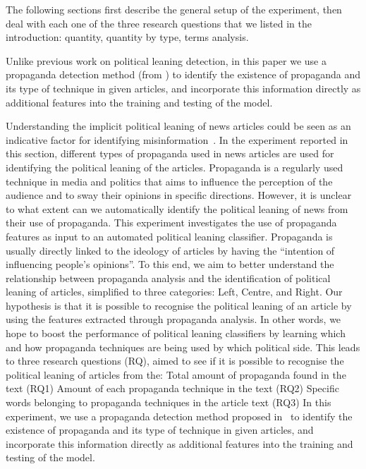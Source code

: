 The following sections first describe the general setup of the experiment, then deal with each one of the three research questions that we listed in the introduction: quantity, quantity by type, terms analysis.%


Unlike previous work on political leaning detection, in this paper we use a propaganda detection method (from \citet{da2019fine}) to identify the existence of propaganda and its type of technique in given articles, and incorporate this information directly as additional features into the training and testing of the model.  


Understanding the implicit political leaning of news articles could be seen as an indicative factor for identifying misinformation~\citep{spezzano2021s}. In the experiment reported in this section, different types of propaganda used in news articles are used for identifying the political leaning of the articles. 
Propaganda is a regularly used technique in media and politics that aims to influence the perception of the audience and to sway their opinions in specific directions. However, it is unclear to what extent can we automatically identify the political leaning of news from their use of propaganda. This experiment investigates the use of propaganda features as input to an automated political leaning classifier.
Propaganda is usually directly linked to the ideology of articles by having the “intention of influencing people’s opinions”. To this end, we aim to better understand the relationship between propaganda analysis and the identification of political leaning of articles, simplified to three categories: Left, Centre, and Right.
Our hypothesis is that it is possible to recognise the political leaning of an article by using the features extracted through propaganda analysis. In other words, we hope to boost the performance of political leaning classifiers by learning which and how propaganda techniques are being used by which political side. This leads to three research questions (RQ), aimed to see if it is possible to recognise the political leaning of articles from the:
Total amount of propaganda found in the text (RQ1)
Amount of each propaganda technique in the text (RQ2)
Specific words belonging to propaganda techniques in the article text (RQ3)
In this experiment, we use a propaganda detection method proposed in~\citet{da2019fine} to identify the existence of propaganda and its type of technique in given articles, and incorporate this information directly as additional features into the training and testing of the model.

